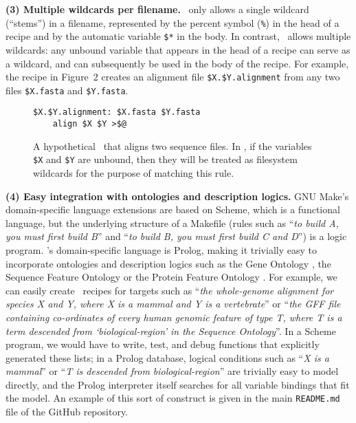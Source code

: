 {\bf (3) Multiple wildcards per filename.}
\make\ only allows a single wildcard (``stems'') in a filename,
represented by the percent symbol ({\tt \%}) in the head of a recipe and by the automatic variable {\tt \$*} in the body.
In contrast, \biomake\ allows multiple wildcards: any unbound variable that appears in the head of a recipe can serve as a wildcard,
and can subsequently be used in the body of the recipe.
For example, the recipe in Figure~2 creates an alignment file {\tt \$X.\$Y.alignment} from any two files {\tt \$X.fasta} and {\tt \$Y.fasta}.


\begin{figure}[H]
\begin{Verbatim}[frame=single]
$X.$Y.alignment: $X.fasta $Y.fasta
    align $X $Y >$@
\end{Verbatim}
\caption{
  A hypothetical \Makefile\ that aligns two sequence files.
  In \biomake, if the variables {\tt \$X} and {\tt \$Y} are unbound, then they will be treated as filesystem wildcards
  for the purpose of matching this rule.
}
\end{figure}

{\bf (4) Easy integration with ontologies and description logics.}
GNU Make's domain-specific language extensions are based on Scheme, which is a functional language,
but the underlying structure of a Makefile (rules such as ``{\em to build A, you must first build B}'' and ``{\em to build B, you must first build C and D}'')
is a logic program.
\biomake's domain-specific language is Prolog, making it trivially easy to incorporate ontologies and description logics
such as the Gene Ontology \citep{GeneOntology2000,GeneOntology2015}, the Sequence Feature Ontology \citep{SequenceOntology2005} or the Protein Feature Ontology \citep{ProteinFeatureOntology2008}.
For example, we can easily create \biomake\ recipes for targets such as ``{\em the whole-genome alignment for species X and Y, where X is a mammal and Y is a vertebrate}''
or ``{\em the GFF file containing co-ordinates of every human genomic feature of type T, where T is a term descended from `biological-region' in the Sequence Ontology}''.
In a Scheme program, we would have to write, test, and debug functions that explicitly generated these lists;
in a Prolog database, logical conditions such as ``{\em X is a mammal}'' or ``{\em T is descended from biological-region}'' are trivially easy to model directly,
and the Prolog interpreter itself searches for all variable bindings that fit the model.
An example of this sort of construct is given in the main {\tt README.md} file of the GitHub repository.

